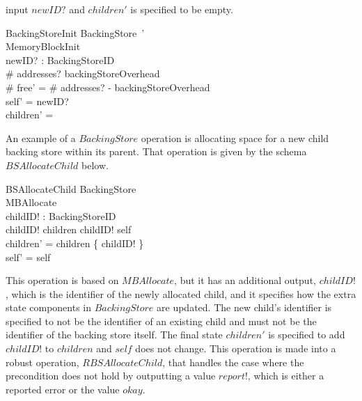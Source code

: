 \documentclass[a4paper,10pt]{report}
\begin{document}
input $newID?$ and $children'$ is specified to be empty.
\begin{schema}{BackingStoreInit}
  BackingStore~' \\
  MemoryBlockInit \\
  newID?
  : BackingStoreID \\
  \where \# addresses?
  \geq backingStoreOverhead \\
  \# free' = \# addresses?
  - backingStoreOverhead \\
  self' = newID?
  \\
  children' = \emptyset \\
\end{schema}
%
An example of a $BackingStore$ operation is allocating space for a new
child backing store within its parent.
That operation is given by the schema $BSAllocateChild$ below.
%
\begin{schema}{BSAllocateChild}
  \Delta BackingStore \\
  MBAllocate \\
  childID!
  : BackingStoreID \\
  \where childID!
  \notin children \land childID!
  \neq self \\
  children' = children \cup \{ childID!
  \} \\
  self' = self
\end{schema}
%
This operation is based on $MBAllocate$, but it has an additional
output, $childID!$, which is the identifier of the newly allocated
child, and it specifies how the extra state components in
$BackingStore$ are updated.
The new child's identifier is specified to not be the identifier of an
existing child and must not be the identifier of the backing store
itself.
The final state $children'$ is specified to add $childID!$ to
$children$ and $self$ does not change.
This operation is made into a robust operation, $RBSAllocateChild$,
that handles the case where the precondition does not hold by
outputting a value $report!$, which is either a reported error or the
value $okay$.
\end{document}
